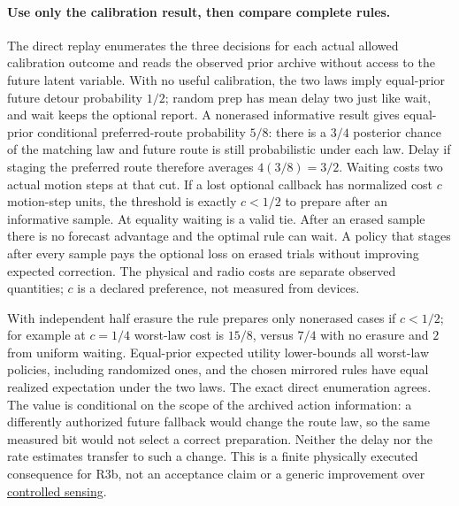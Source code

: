 \documentclass{article}
\begin{document}
\paragraph{Use only the calibration result, then compare complete rules.}
The direct replay enumerates the three decisions for each actual
allowed calibration outcome and reads the observed prior archive
without access to the future latent variable. With no useful
calibration, the two laws imply equal-prior future detour
probability $1/2$; random prep has mean delay two just like wait,
and wait keeps the optional report. A nonerased informative
result gives equal-prior conditional preferred-route probability
$5/8$: there is a $3/4$ posterior chance of the matching law and
future route is still probabilistic under each law. Delay if
staging the preferred route therefore averages $4(3/8)=3/2$.
Waiting costs two actual motion steps at that cut. If a lost
optional callback has normalized cost $c$ motion-step units,
the threshold is exactly $c<1/2$ to prepare after an informative
sample. At equality waiting is a valid tie. After an erased
sample there is no forecast advantage and the optimal rule can
wait. A policy that stages after every sample pays the optional
loss on erased trials without improving expected correction.
The physical and radio costs are separate observed quantities;
$c$ is a declared preference, not measured from devices.

With independent half erasure the rule prepares only nonerased
cases if $c<1/2$; for example at $c=1/4$ worst-law cost is $15/8$,
versus $7/4$ with no erasure and $2$ from uniform waiting.
Equal-prior expected utility lower-bounds all worst-law policies,
including randomized ones, and the chosen mirrored rules have
equal realized expectation under the two laws. The exact
direct enumeration agrees. The value is conditional on the
scope of the archived action information: a differently
authorized future fallback would change the route law, so the
same measured bit would not select a correct preparation.
Neither the delay nor the rate estimates transfer to such a change.
This is a finite physically executed consequence for R3b, not
an acceptance claim or a generic improvement over
\href{https://arxiv.org/abs/1205.0858}{controlled sensing}.
\end{document}
